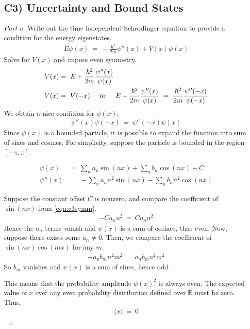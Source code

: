 \documentclass{article}
\numberwithin{equation}{section}
\def\<{{\langle}}
\def\>{{\rangle}}
\newcommand{\textOr}{
    {
        \hspace{5mm}
        \textrm{or}
        \hspace{5mm}
    }
}
\newcommand{\RR}{\mathbb{R}}
\begin{document}
\subsection*{C3) Uncertainty and Bound States}
\begin{proof}
    [Part a]
    Write out the time independent Schrodinger equation to provide a 
    condition for the energy eigenstates. 
    \begin{align}
        E\psi(x) \ = \ -\frac{\hbar^2}{2m} \psi''(x) + V(x) \psi(x)
    \end{align}
    Solve for $V(x)$ and impose even symmetry. 
    \begin{align}
        V(x) & = \ E + \frac{\hbar^2}{2m} \frac{\psi''(x)}{\psi(x)} 
        \\ V(x) & = \ V(-x) \textOr 
        E + \frac{\hbar^2}{2m} \frac{\psi''(x)}{\psi(x)}  \ = \ 
\frac{\hbar^2}{2m} \frac{\psi''(-x)}{\psi(-x)} 
    \end{align}
    We obtain a nice condition for $\psi(x)$. 
\begin{align}\label{eqn:c3symm}
        \psi''(x) \psi(-x) \ = \ \psi''(-x)\psi(x)
\end{align}
Since $\psi(x)$ is a bounded particle, 
it is possible to expand the function into 
sum of sines and cosines. For simplicity, 
suppose the particle is bounded in the region $[-\pi, \pi]$. 

\begin{align}
    \psi(x) & = \ \sum_n a_n \sin(nx) + \sum_n b_n \cos(nx) + C \\ 
    \psi''(x) & = \ -\sum_n a_n n^2 \sin(nx) - \sum_n b_n n^2 \cos(nx) 
\end{align}

Suppose the constant offset $C$ is nonzero, and 
compare the coefficient of $\sin(nx)$ from \eqref{eqn:c3symm}. 
\begin{align}
    -Ca_n n^2 \ = \ C a_n n^2 
\end{align}
Hence the $a_n$ terms vanish and $\psi(x)$ is a sum of cosines, 
thus even. Now, suppose there exists some $a_n \neq 0$. Then, 
we compare the coefficient of $\sin(nx)\cos(mx)$ for any $m$. 
\begin{align}
    -a_n b_m n^2 m^2 \ = \  a_n b_m n^2 m^2
\end{align}
So $b_m$ vanishes and $\psi(x)$ is a sum of sines, hence odd. 

This means that the probability amplitude $\psi(x)^2$ is always 
even. The expected value of $x$ over any even probability distribution 
defined over $\RR$ must be zero. Thus, 
\begin{align}
    \<x\> \ = \ 0
\end{align}


\end{proof}
\end{document}
